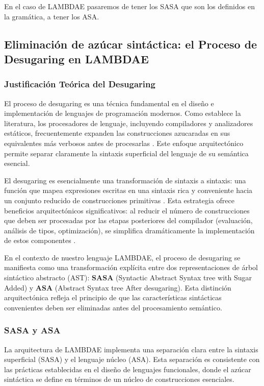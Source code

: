 \documentclass[a4paper,12pt]{article}
\begin{document}
En el caso de LAMBDAE pasaremos de tener los SASA que son los definidos en la gramática, a tener los ASA. 

\subsection{Eliminación de azúcar sintáctica: el Proceso de Desugaring en LAMBDAE}

\subsubsection*{Justificación Teórica del Desugaring}

El proceso de desugaring es una técnica fundamental en el diseño e implementación de lenguajes de programación modernos. Como establece la literatura, los procesadores de lenguaje, incluyendo compiladores y analizadores estáticos, frecuentemente expanden las construcciones azucaradas en sus equivalentes más verbosos antes de procesarlas \cite{Rathi2020, Serokell2020}. Este enfoque arquitectónico permite separar claramente la sintaxis superficial del lenguaje de su semántica esencial.

El desugaring es esencialmente una transformación de sintaxis a sintaxis: una función que mapea expresiones escritas en una sintaxis rica y conveniente hacia un conjunto reducido de construcciones primitivas \cite{Rathi2020}. Esta estrategia ofrece beneficios arquitectónicos significativos: al reducir el número de construcciones que deben ser procesadas por las etapas posteriores del compilador (evaluación, análisis de tipos, optimización), se simplifica dramáticamente la implementación de estos componentes \cite{desugaring,Serokell2020}.

En el contexto de nuestro lenguaje LAMBDAE, el proceso de desugaring se manifiesta como una transformación explícita entre dos representaciones de árbol sintáctico abstracto (AST): \textbf{SASA} (Syntactic Abstract Syntax tree with Sugar Added) y \textbf{ASA} (Abstract Syntax tree After desugaring). Esta distinción arquitectónica refleja el principio de que las características sintácticas convenientes deben ser eliminadas antes del procesamiento semántico.

\subsubsection*{SASA y ASA}

La arquitectura de LAMBDAE implementa una separación clara entre la sintaxis superficial (SASA) y el lenguaje núcleo (ASA). Esta separación es consistente con las prácticas establecidas en el diseño de lenguajes funcionales, donde el azúcar sintáctica se define en términos de un núcleo de construcciones esenciales.
\end{document}
